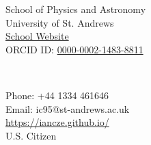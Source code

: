 \parbox[t]{3in}{
\begin{flushleft}
School of Physics and Astronomy\\
University of St. Andrews\\
\href{https://www.st-andrews.ac.uk/physics-astronomy/people/ic95/}{School Website} \\
ORCID ID: \href{http://orcid.org/0000-0002-1483-8811}{0000-0002-1483-8811} \\
\end{flushleft}} \ \hfill  \
\parbox[t]{3in}{
\begin{flushright}
Phone: +44 1334 461646\\
Email: ic95@st-andrews.ac.uk\\
\url{https://iancze.github.io/}\\
U.S. Citizen
\end{flushright}}
